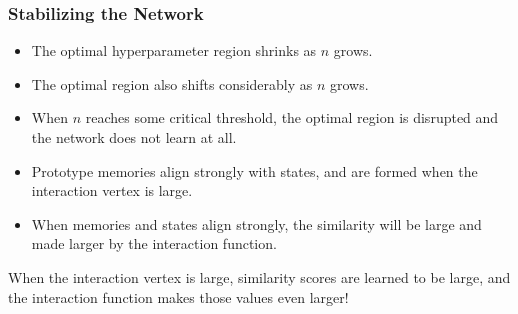\begin{frame}
    \frametitle{Stabilizing the Network}
    
    \begin{itemize}
        \item The optimal hyperparameter region shrinks as \(n\) grows.
        \item The optimal region also shifts considerably as \(n\) grows.
        \item When \(n\) reaches some critical threshold, the optimal region is disrupted and the network does not learn at all.
        \pause
        \item Prototype memories align strongly with states, and are formed when the interaction vertex is large.
        \pause
        \item When memories and states align strongly, the similarity will be large and made larger by the interaction function.
    \end{itemize}
    
    \pause
    \begin{block}{}
        When the interaction vertex is large, similarity scores are learned to be large, and the interaction function makes those values even larger!
    \end{block}
    
\end{frame}
    